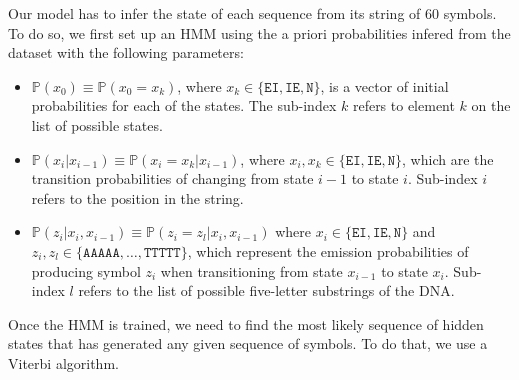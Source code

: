 \documentclass[a4paper, 11pt]{article} %
\begin{document}
Our model has to infer the state of each sequence from its string of 60 symbols. To do so, we first set up an HMM using the a priori probabilities infered from the dataset with the following parameters:
\begin{itemize}
\item  $\mathbb{P}(x_0) \equiv \mathbb{P}(x_0 = x_{k})$, where $x_{k} \in \{\texttt{EI}, \texttt{IE}, \texttt{N} \}$, is a vector of initial probabilities for each of the states. The sub-index $k$ refers to element $k$ on the list of possible states.
\item $\mathbb{P}(x_i | x_{i-1}) \equiv \mathbb{P}(x_i = x_k | x_{i-1})$, where $x_{i}, x_{k} \in \{\texttt{EI}, \texttt{IE}, \texttt{N} \}$, which are the transition probabilities of changing from state $i-1$ to state $i$. Sub-index $i$ refers to the position in the string.
\item $\mathbb{P}(z_i | x_i, x_{i-1}) \equiv \mathbb{P}(z_i = z_l | x_i, x_{i-1})$ where $x_{i} \in \{\texttt{EI}, \texttt{IE}, \texttt{N} \}$ and $z_i, z_{l} \in \{\texttt{AAAAA}, \dots, \texttt{TTTTT}\}$, which represent the emission probabilities of producing symbol $z_{i}$ when transitioning from state $x_{i-1}$ to state $x_{i}$. Sub-index $l$ refers to the list of possible five-letter substrings of the DNA.
\end{itemize}

Once the HMM is trained, we need to find the most likely sequence of hidden states that has generated any given sequence of symbols. To do that, we use a Viterbi algorithm.
\end{document}
